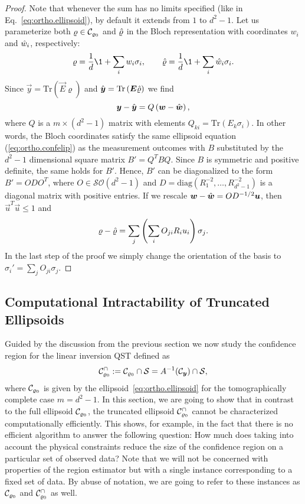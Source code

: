 \begin{proof}
  Note that whenever the sum has no limits specified (like in Eq.~\eqref{eq:ortho.ellipsoid}), by default it extends from $1$ to $d^{2}-1$.
  Let us parameterize both $\varrho \in \mathcal{C}_{\varrho_0}$ and $\hat{\varrho}$ in the Bloch representation with coordinates $w_{i}$ and $\hat{w}_i$, respectively:
  \[
    \varrho=\frac{1}{d}\1 + \sum_{i}w_{i}\sigma_{i},
    \qquad\estim{\varrho}=\frac{1}{d} \1 + \sum_{i}\estim{w}_{i}\sigma_{i}.
  \]
  Since $\vec{y}=\textrm{Tr}\left(\vec{E}\varrho\right)$ and $\hat{{\boldsymbol{y}}}=\textrm{Tr}\left({\boldsymbol{E}}\hat{\varrho}\right)$ we find
  \[
    {\boldsymbol{y}}-\hat{{\boldsymbol{y}}}=Q\left({\boldsymbol{w}}-\hat{{\boldsymbol{w}}}\right),
  \]
  where $Q$ is a $m\times(d^{2}-1)$ matrix with elements $Q_{ki}=\textrm{Tr}\left(E_{k}\sigma_{i}\right)$.
  In other words, the Bloch coordinates satisfy the same ellipsoid equation (\ref{eq:ortho.confelip}) as the measurement outcomes with $B$ substituted by the $d^{2}-1$ dimensional square matrix $B'=Q^{T}BQ$.
  Since $B$ is symmetric and positive definite, the same holds for $B'$.
  Hence, $B'$ can be diagonalized to the form $B'=ODO^{T}$, where $O \in \mathcal{SO}(d^2 - 1)$ and $D=\textrm{diag}(R_{1}^{-2},\ldots,R_{d^{2}-1}^{-2})$ is a diagonal matrix with positive entries.
  If we rescale ${\boldsymbol{w}}-\hat{{\boldsymbol{w}}}=OD^{-1/2}{\boldsymbol{u}}$, then $\vec{u}^{T}\vec{u}\leq1$ and
  \[
    \varrho-\hat{\varrho}=\sum_{j}\left(\sum_{i}O_{ji}R_{i}u_{i}\right)\sigma_{j}.
  \]
  In the last step of the proof we simply change the orientation of the basis to $\sigma_{i}'=\sum_{j}O_{ji}\sigma_{j}$.
\end{proof}


\subsection{Computational Intractability of Truncated Ellipsoids}
\label{sub:ortho.hard}

Guided by the discussion from the previous section we now study the confidence region for the linear inversion QST defined as
\[
  \label{eq:ortho.truncated_ellipsoid}
  \mathcal{C}_{\varrho_0}^\cap := \mathcal{C}_{\varrho_0} \cap \mathcal{S} = A^{-1}(\mathcal{C}_{{\boldsymbol{y}}}) \cap \mathcal{S},
\]
where $\mathcal{C}_{\varrho_0}$ is given by the ellipsoid~\eqref{eq:ortho.ellipsoid} for the tomographically complete case $m=d^2 - 1$.
In this section, we are going to show that in contrast to the full ellipsoid $\mathcal{C}_{\varrho_0}$, the truncated ellipsoid $\mathcal{C}_{\varrho_0}^\cap$ cannot be characterized computationally efficiently.
This shows, for example, in the fact that there is no efficient algorithm to answer the following question:
How much does taking into account the physical constraints reduce the size of the confidence region on a particular set of observed data?
Note that we will not be concerned with properties of the region estimator but with a single instance corresponding to a fixed set of data.
By abuse of notation, we are going to refer to these instances as $\mathcal{C}_{\varrho_0}$ and $\mathcal{C}_{\varrho_0}^\cap$ as well.

